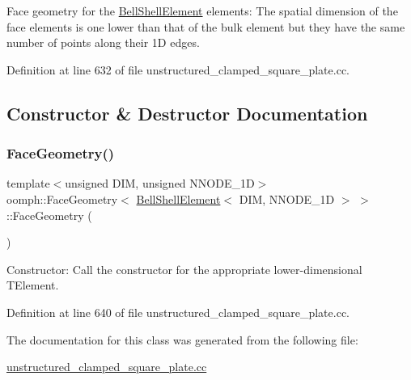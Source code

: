 Face geometry for the \hyperlink{classoomph_1_1BellShellElement}{Bell\+Shell\+Element} elements\+: The spatial dimension of the face elements is one lower than that of the bulk element but they have the same number of points along their 1D edges. 

Definition at line 632 of file unstructured\+\_\+clamped\+\_\+square\+\_\+plate.\+cc.



\subsection{Constructor \& Destructor Documentation}
\mbox{\label{classoomph_1_1FaceGeometry_3_01BellShellElement_3_01DIM_00_01NNODE__1D_01_4_01_4_ae3b9e81d2729d8b818c563812e8cf8f9}} 
\subsubsection{\texorpdfstring{Face\+Geometry()}{FaceGeometry()}}
{\footnotesize\ttfamily template$<$unsigned D\+IM, unsigned N\+N\+O\+D\+E\+\_\+1D$>$ \\
oomph\+::\+Face\+Geometry$<$ \hyperlink{classoomph_1_1BellShellElement}{Bell\+Shell\+Element}$<$ D\+IM, N\+N\+O\+D\+E\+\_\+1D $>$ $>$\+::Face\+Geometry (\begin{DoxyParamCaption}{ }\end{DoxyParamCaption})\hspace{0.3cm}{\ttfamily [inline]}}



Constructor\+: Call the constructor for the appropriate lower-\/dimensional T\+Element. 



Definition at line 640 of file unstructured\+\_\+clamped\+\_\+square\+\_\+plate.\+cc.



The documentation for this class was generated from the following file\+:\begin{DoxyCompactItemize}
\item 
\hyperlink{unstructured__clamped__square__plate_8cc}{unstructured\+\_\+clamped\+\_\+square\+\_\+plate.\+cc}\end{DoxyCompactItemize}
